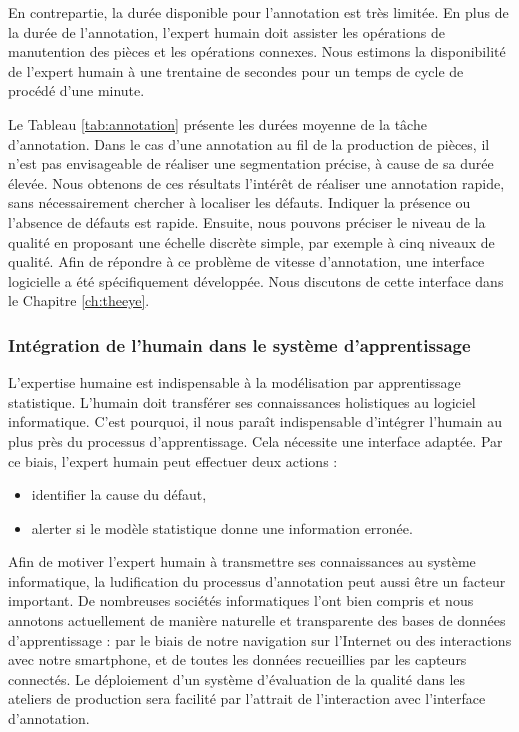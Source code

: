 En contrepartie, la durée disponible pour l'annotation est très limitée. En plus de la durée de l'annotation, l'expert humain doit assister les opérations de manutention des pièces et les opérations connexes.
Nous estimons la disponibilité de l'expert humain à une trentaine de secondes pour un temps de cycle de procédé d'une minute.

Le Tableau \ref{tab:annotation} présente les durées moyenne de la tâche d'annotation.
Dans le cas d'une annotation au fil de la production de pièces, il n'est pas envisageable de réaliser une segmentation précise, à cause de sa durée élevée.
Nous obtenons de ces résultats l'intérêt de réaliser une annotation rapide, sans nécessairement chercher à localiser les défauts.
Indiquer la présence ou l'absence de défauts est rapide.
Ensuite, nous pouvons préciser le niveau de la qualité en proposant une échelle discrète simple, par exemple à cinq niveaux de qualité.
Afin de répondre à ce problème de vitesse d'annotation, une interface logicielle a été spécifiquement développée.
Nous discutons de cette interface dans le Chapitre \ref{ch:theeye}.

\subsubsection{Intégration de l'humain dans le système d'apprentissage}
L'expertise humaine est indispensable à la modélisation par apprentissage statistique.
L'humain doit transférer ses connaissances holistiques au logiciel informatique.
C'est pourquoi, il nous paraît indispensable d'intégrer l'humain au plus près du processus d'apprentissage.
Cela nécessite une interface adaptée.
Par ce biais, l'expert humain peut effectuer deux actions :
\begin{itemize}
	\item identifier la cause du défaut,
	\item alerter si le modèle statistique donne une information erronée.
\end{itemize}

Afin de motiver l'expert humain à transmettre ses connaissances au système informatique, la ludification du processus d'annotation peut aussi être un facteur important.
De nombreuses sociétés informatiques l'ont bien compris et nous annotons actuellement de manière naturelle et transparente des bases de données d'apprentissage : par le biais de notre navigation sur l'Internet ou des interactions avec notre smartphone, et de toutes les données recueillies par les capteurs connectés.
Le déploiement d'un système d'évaluation de la qualité dans les ateliers de production sera facilité par l'attrait de l'interaction avec l'interface d'annotation.

